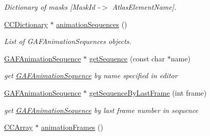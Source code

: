 \begin{DoxyCompactItemize}
\begin{DoxyCompactList}\small\item\em Dictionary of masks \mbox{[}Mask\-Id -\/$>$ Atlas\-Element\-Name\mbox{]}. \end{DoxyCompactList}\item 
\hypertarget{class_g_a_f_1_1_g_a_f_asset_acd15bfc31ea707bd08e6080fea76ef3e}{\hyperlink{class_g_a_f_1_1_c_c_dictionary}{C\-C\-Dictionary} $\ast$ \hyperlink{class_g_a_f_1_1_g_a_f_asset_acd15bfc31ea707bd08e6080fea76ef3e}{animation\-Sequences} ()}\label{class_g_a_f_1_1_g_a_f_asset_acd15bfc31ea707bd08e6080fea76ef3e}

\begin{DoxyCompactList}\small\item\em List of G\-A\-F\-Animation\-Sequences objects. \end{DoxyCompactList}\item 
\hypertarget{class_g_a_f_1_1_g_a_f_asset_ab28aad7bb6081207de2e6f0871c64757}{\hyperlink{class_g_a_f_1_1_g_a_f_animation_sequence}{G\-A\-F\-Animation\-Sequence} $\ast$ \hyperlink{class_g_a_f_1_1_g_a_f_asset_ab28aad7bb6081207de2e6f0871c64757}{get\-Sequence} (const char $\ast$name)}\label{class_g_a_f_1_1_g_a_f_asset_ab28aad7bb6081207de2e6f0871c64757}

\begin{DoxyCompactList}\small\item\em get \hyperlink{class_g_a_f_1_1_g_a_f_animation_sequence}{G\-A\-F\-Animation\-Sequence} by name specified in editor \end{DoxyCompactList}\item 
\hypertarget{class_g_a_f_1_1_g_a_f_asset_a31432e877bd659fbfd1fde8b99251562}{\hyperlink{class_g_a_f_1_1_g_a_f_animation_sequence}{G\-A\-F\-Animation\-Sequence} $\ast$ \hyperlink{class_g_a_f_1_1_g_a_f_asset_a31432e877bd659fbfd1fde8b99251562}{get\-Sequence\-By\-Last\-Frame} (int frame)}\label{class_g_a_f_1_1_g_a_f_asset_a31432e877bd659fbfd1fde8b99251562}

\begin{DoxyCompactList}\small\item\em get \hyperlink{class_g_a_f_1_1_g_a_f_animation_sequence}{G\-A\-F\-Animation\-Sequence} by last frame number in sequence \end{DoxyCompactList}\item 
\hypertarget{class_g_a_f_1_1_g_a_f_asset_a9fee929a803e67ad2cb50b5de16c315a}{\hyperlink{class_g_a_f_1_1_c_c_array}{C\-C\-Array} $\ast$ \hyperlink{class_g_a_f_1_1_g_a_f_asset_a9fee929a803e67ad2cb50b5de16c315a}{animation\-Frames} ()}\label{class_g_a_f_1_1_g_a_f_asset_a9fee929a803e67ad2cb50b5de16c315a}


\end{DoxyCompactItemize}

